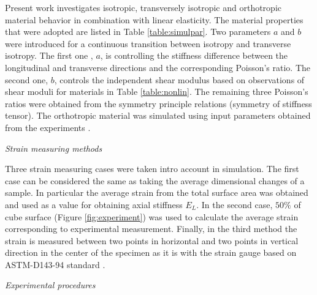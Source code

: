 \documentclass[review]{elsarticle}
\begin{document}
Present work investigates isotropic, transversely isotropic and orthotropic
material behavior in combination with linear elasticity.
The material properties that were adopted are listed in
Table \ref{table:simulpar}. Two parameters $a$ and $b$ were introduced for a continuous transition between isotropy and transverse isotropy. 
The first one , $a$, is controlling the stiffness difference between the
longitudinal and transverse directions and the corresponding Poisson's ratio.
The second one, $b$, controls the independent shear modulus based on
observations of shear moduli for materials in Table \ref{table:nonlin}.
The remaining three Poisson's ratios were obtained from the symmetry
principle relations (symmetry of stiffness tensor\cite{hyer2009stress}). The
orthotropic material was simulated using input parameters obtained from the experiments \cite{vorobyevcharacterisation}.


\begin{description}
\item{\textit{Strain measuring methods}}
\end{description}


Three strain measuring cases were taken intro account in simulation. The first
case can be considered the same as taking the average dimensional changes of a
sample. In particular the average strain from the total surface area was
obtained and used as a value for obtaining axial stiffness $E_L$. In the
second case, $50\%$ of cube surface (Figure \ref{fig:experiment}) was
used to calculate the average strain corresponding to experimental measurement. 
Finally, in the third method the strain is measured between two points
in horizontal and two points in vertical direction in the center of the specimen
as it is with the strain gauge based on ASTM-D143-94 standard
\cite{american2009standard}.

\begin{description}
\item{\textit{Experimental procedures}}
\end{description}
\end{document}
